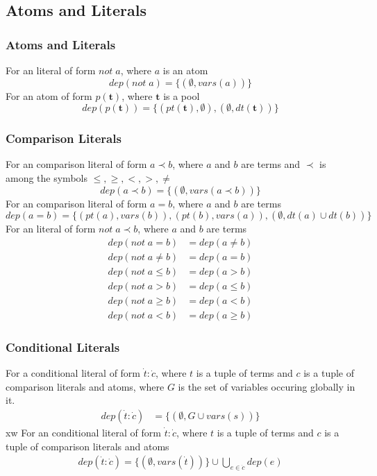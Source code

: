 \documentclass{article}
\newcommand{\pool}[1]{\boldsymbol{#1}}
\newcommand{\tuple}[1]{\dot{#1}}
\newcommand{\set}[1]{\{#1\}}
\newcommand{\dep}[2]{\{(#1), (#2)\}}
\begin{document}
	\subsection{Atoms and Literals}
	\subsubsection{Atoms and Literals}
	For an literal of form $not \; a$, where $a$ is an atom
	\begin{equation*}
		dep(not \; a) = \set{(\emptyset, vars(a))}
	\end{equation*}
	For an atom of form $p(\pool{t})$, where $\pool{t}$ is a pool
	\begin{equation*}
		dep(p(\pool{t})) = \dep{pt(\pool{t}), \emptyset}{\emptyset, dt(\pool{t})}
	\end{equation*}

	\subsubsection{Comparison Literals}
	For an comparison literal of form $a \prec b$, where $a$ and $b$ are terms and $\prec$ is among the symbols $\leq,\ge,<,>,\neq$
	\begin{equation*}
		dep(a \prec b) = \set{(\emptyset, vars(a \prec b))}
	\end{equation*}
	For an comparison literal of form $a = b$, where $a$ and $b$ are terms
	\begin{equation*}
		dep(a = b) = \set{(pt(a), vars(b)), (pt(b), vars(a)), (\emptyset, dt(a) \cup dt(b))}
	\end{equation*}
	For an literal of form $not \; a \prec b$, where $a$ and $b$ are terms
	\begin{align*}
		dep(not \; a = b) &= dep(a \neq b) \\
		dep(not \; a \neq b) &= dep(a = b) \\
		dep(not \; a \leq b) &= dep(a > b) \\
		dep(not \; a > b) &= dep(a \leq b) \\
		dep(not \; a \ge b) &= dep(a < b) \\
		dep(not \; a < b) &= dep(a \ge b)
	\end{align*}

	\subsubsection{Conditional Literals}
	For a conditional literal of form $\tuple{t} : \tuple{c}$, where $t$ is a tuple of terms and $c$ is a tuple of comparison literals and atoms, where $G$ is the set of variables occuring globally in it.
	\begin{align*}
		dep(\tuple{t} : \tuple{c}) &= \set{(\emptyset, G \cup vars(s))}
	\end{align*}xw
	For an conditional literal of form $\tuple{t} : \tuple{c}$, where $t$ is a tuple of terms and $c$ is a tuple of comparison literals and atoms
	\begin{align*}
		dep(\tuple{t} : \tuple{c}) = \set{(\emptyset, vars(\tuple{t}))} \cup \bigcup_{e \in \tuple{c}} dep(e)
	\end{align*}
\end{document}

